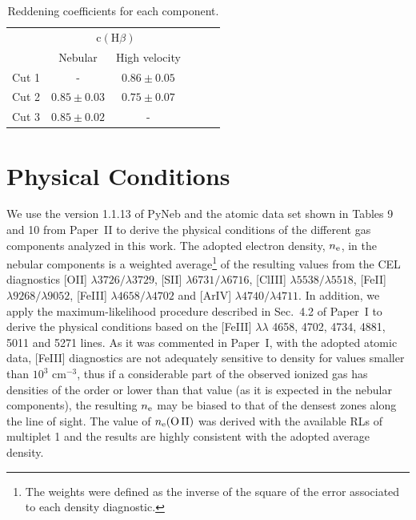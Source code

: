 \documentclass[fleqn,usenatbib]{mnras}
\begin{document}
\begin{table}
\caption{Reddening coefficients for each component.}
\label{tab:c_extin}
\begin{tabular}{lccccc}
\hline
 & \multicolumn{2}{c}{$\text{c}(\text{H}\beta)$} \\
  & Nebular & High velocity\\
\hline
Cut 1 & - & $0.86 \pm  0.05$  \\
Cut 2 & $0.85 \pm 0.03$ &$0.75 \pm 0.07$\\
Cut 3 & $0.85 \pm 0.02$&-\\
\hline
\end{tabular}
\end{table}





\section{Physical Conditions}
\label{sec:physical_cond}

We use the version 1.1.13 of PyNeb \citep{Luridiana15} and the atomic data set shown in Tables 9 and 10 from Paper~II to derive the physical conditions of the different gas  components analyzed in this work. The adopted electron density, $n_{\rm e}$, in the nebular components is a weighted average\footnote{The weights were defined as the inverse of the square of the error associated to each density diagnostic.} of the resulting values from the CEL diagnostics
[O\thinspace II] $\lambda3726/\lambda3729$, [S\thinspace II] $\lambda6731/\lambda6716$, [Cl\thinspace III] $\lambda5538/\lambda5518$, [Fe\thinspace II] $\lambda9268/\lambda9052$, [Fe\thinspace III] $\lambda4658/\lambda4702$ and [Ar\thinspace IV]  $\lambda4740/\lambda4711$.  In addition, we apply the maximum-likelihood procedure described in Sec.~4.2 of Paper~I to derive the physical conditions based on the [Fe\thinspace III] $\lambda \lambda $ 4658, 4702, 4734, 4881, 5011 and 5271 lines. As it was commented in Paper~I, with the adopted atomic data, [Fe\thinspace III] diagnostics are not adequately sensitive to density for values smaller than $10^{3} \text{ cm}^{-3}$, thus if a considerable part of the observed ionized gas has densities of the order or lower than that value (as it is expected in the nebular components), the resulting $n_{\rm e}$ may be biased to that of the densest zones along the line of sight. The value of $n_{\rm e}(\text{O\thinspace II})$ was derived with the available RLs of multiplet 1 and the results are highly consistent with the adopted average density.
\end{document}
